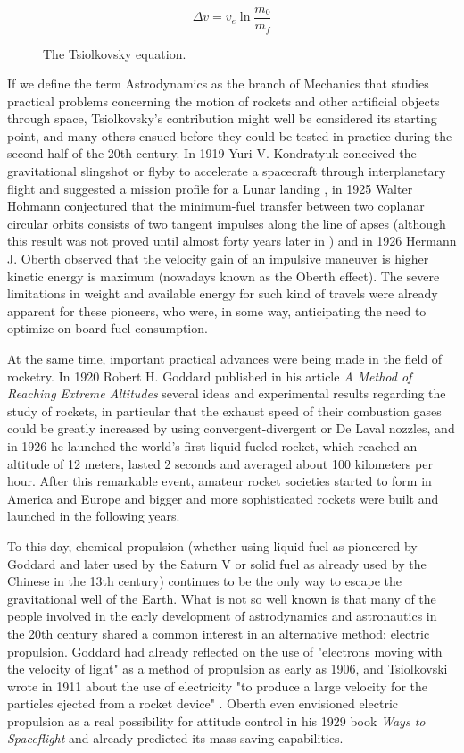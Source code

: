 
\begin{figure}[h]
\[\Delta v = v_e \ln \frac{m_0}{m_f}\]
\caption{The Tsiolkovsky equation.}
\end{figure}

If we define the term Astrodynamics as the branch of Mechanics that studies practical problems concerning the motion of rockets and other artificial objects through space, Tsiolkovsky's contribution might well be considered its starting point, and many others ensued before they could be tested in practice during the second half of the 20th century. In 1919 Yuri V. Kondratyuk conceived the gravitational slingshot or flyby to accelerate a spacecraft through interplanetary flight and suggested a mission profile for a Lunar landing \cite{siddiqi2000challenge}, in 1925 Walter Hohmann conjectured that the minimum-fuel transfer between two coplanar circular orbits consists of two tangent impulses along the line of apses (although this result was not proved until almost forty years later in \cite{lawden1963optimal}) and in 1926 Hermann J. Oberth observed that the velocity gain of an impulsive maneuver is higher kinetic energy is maximum (nowadays known as the Oberth effect). The severe limitations in weight and available energy for such kind of travels were already apparent for these pioneers, who were, in some way, anticipating the need to optimize on board fuel consumption.

At the same time, important practical advances were being made in the field of rocketry. In 1920 Robert H. Goddard published in his article \textit{A Method of Reaching Extreme Altitudes} several ideas and experimental results regarding the study of rockets, in particular that the exhaust speed of their combustion gases could be greatly increased by using convergent-divergent or De Laval nozzles, and in 1926 he launched the world's first liquid-fueled rocket, which reached an altitude of 12 meters, lasted 2 seconds and averaged about 100 kilometers per hour. After this remarkable event, amateur rocket societies started to form in America and Europe and bigger and more sophisticated rockets were built and launched in the following years.

To this day, chemical propulsion (whether using liquid fuel as pioneered by Goddard and later used by the Saturn V or solid fuel as already used by the Chinese in the 13th century) continues to be the only way to escape the gravitational well of the Earth. What is not so well known is that many of the people involved in the early development of astrodynamics and astronautics in the 20th century shared a common interest in an alternative method: electric propulsion. Goddard had already reflected on the use of "electrons moving with the velocity of light" as a method of propulsion as early as 1906, and Tsiolkovski wrote in 1911 about the use of electricity "to produce a large velocity for the particles ejected from a rocket device" \cite{choueiri2004history}. Oberth even envisioned electric propulsion as a real possibility for attitude control in his 1929 book \textit{Ways to Spaceflight} and already predicted its mass saving capabilities.

